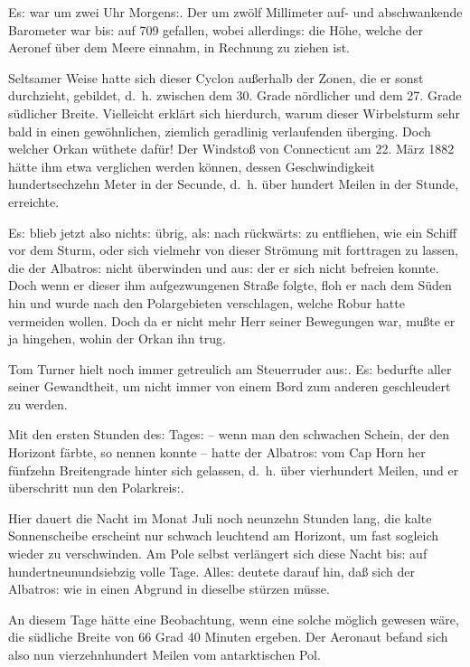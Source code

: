 \documentclass[oneside,12pt]{book}
\newcommand{\s}{s:}
\begin{document}
E{\s} war um zwei Uhr Morgen{\s}. Der um zw\"olf Millimeter auf- und
abschwankende Barometer war bi{\s} auf 709 gefallen, wobei
allerding{\s} die H\"ohe, welche der Aeronef \"uber dem Meere
einnahm, in Rechnung zu ziehen ist.

Seltsamer Weise hatte sich dieser Cyclon au{\ss}erhalb der Zonen, die
er sonst durchzieht, gebildet, d.~h. zwischen dem 30. Grade
n\"ordlicher und dem 27. Grade s\"udlicher Breite. Vielleicht
erkl\"art sich hierdurch, warum dieser Wirbelsturm sehr bald in einen
gew\"ohnlichen, ziemlich geradlinig verlaufenden \"uberging. Doch
welcher Orkan w\"uthete daf\"ur! Der Windsto{\ss} von Connecticut am
22. M\"arz 1882 h\"atte ihm etwa verglichen werden k\"onnen, dessen
Geschwindigkeit hundertsechzehn Meter in der Secunde, d.~h. \"uber
hundert Meilen in der Stunde, erreichte.

E{\s} blieb jetzt also nicht{\s} \"ubrig, al{\s} nach r\"uckw\"art{\s}
zu entfliehen, wie ein Schiff vor dem Sturm, oder sich vielmehr von
dieser Str\"omung mit forttragen zu lassen, die der
{\glqq}Albatro{\s}{\grqq} nicht \"uberwinden und au{\s} der er sich
nicht befreien konnte. Doch wenn er dieser ihm aufgezwungenen
Stra{\ss}e folgte, floh er nach dem S\"uden hin und wurde nach den
Polargebieten verschlagen, welche Robur hatte vermeiden wollen. Doch
da er nicht mehr Herr seiner Bewegungen war, mu{\ss}te er ja
hingehen, wohin der Orkan ihn trug.

Tom Turner hielt noch immer getreulich am Steuerruder au{\s}. E{\s}
bedurfte aller seiner Gewandtheit, um nicht immer von einem Bord zum
anderen geschleudert zu werden.

Mit den ersten Stunden de{\s} Tage{\s} -- wenn man den schwachen
Schein, der den Horizont f\"arbte, so nennen konnte -- hatte der
{\glqq}Albatro{\s}{\grqq} vom Cap Horn her f\"unfzehn Breitengrade
hinter sich gelassen, d.~h. \"uber vierhundert Meilen, und er
\"uberschritt nun den Polarkrei{\s}.

Hier dauert die Nacht im Monat Juli noch neunzehn Stunden lang, die
kalte Sonnenscheibe erscheint nur schwach leuchtend am Horizont, um
fast sogleich wieder zu verschwinden. Am Pole selbst verl\"angert
sich diese Nacht bi{\s} auf hundertneunundsiebzig volle Tage.
Alle{\s} deutete darauf hin, da{\ss} sich der {\glqq}Albatro{\s}{\grqq}
wie in einen Abgrund in dieselbe st\"urzen m\"usse.

An diesem Tage h\"atte eine Beobachtung, wenn eine solche m\"oglich
gewesen w\"are, die s\"udliche Breite von 66 Grad 40 Minuten ergeben.
Der Aeronaut befand sich also nun vierzehnhundert Meilen vom
antarktischen Pol.
\end{document}
